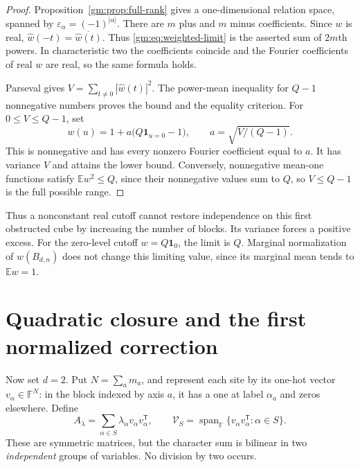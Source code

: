 \documentclass[11pt,a4paper]{article}
\numberwithin{equation}{section}
\theoremstyle{definition}
\theoremstyle{remark}
\newcommand{\F}{\mathbb F}
\newcommand{\E}{\mathbb E}
\newcommand{\1}{\mathbf 1}
\newcommand{\Span}{\operatorname{span}}
\begin{document}
\begin{proof}
Proposition~\ref{gm:prop:full-rank} gives a one-dimensional relation
space, spanned by $\varepsilon_\alpha=(-1)^{|\alpha|}$. There are $m$ plus
and $m$ minus coefficients. Since $w$ is real,
$\widehat w(-t)=\overline{\widehat w(t)}$. Thus
\eqref{gm:eq:weighted-limit} is the asserted sum of $2m$th powers. In
characteristic two the coefficients coincide and the Fourier coefficients
of real $w$ are real, so the same formula holds.

Parseval gives $V=\sum_{t\ne0}|\widehat w(t)|^2$. The power-mean
inequality for $Q-1$ nonnegative numbers proves the bound and the equality
criterion. For $0\leq V\leq Q-1$, set
\begin{equation}\label{gm:eq:cutoff-extremizer}
 w(u)=1+a\bigl(Q\1_{u=0}-1\bigr),\qquad
 a=\sqrt{V/(Q-1)}.
\end{equation}
This is nonnegative and has every nonzero Fourier coefficient equal to
$a$. It has variance $V$ and attains the lower bound. Conversely,
nonnegative mean-one functions satisfy $\E w^2\leq Q$, since their
nonnegative values sum to $Q$, so $V\leq Q-1$ is the full possible range.
\end{proof}

Thus a nonconstant real cutoff cannot restore independence on this first
obstructed cube by increasing the number of blocks. Its variance forces
a positive excess. For the zero-level cutoff $w=Q\1_0$, the limit is $Q$.
Marginal normalization of $w(B_{d,n})$ does not change this limiting value,
since its marginal mean tends to $\E w=1$.

\section{Quadratic closure and the first normalized correction}
\label{gm:sec:closure}

Now set $d=2$. Put $N=\sum_a m_a$, and represent each site by its one-hot
vector $v_\alpha\in\F^N$: in the block indexed by axis $a$, it has a one
at label $\alpha_a$ and zeros elsewhere. Define
\begin{equation}\label{gm:eq:matrix-space}
 A_\lambda=\sum_{\alpha\in S}\lambda_\alpha v_\alpha v_\alpha^{\mathsf T},
 \qquad
 \mathcal V_S=\Span_\F\{v_\alpha v_\alpha^{\mathsf T}:\alpha\in S\}.
\end{equation}
These are symmetric matrices, but the character sum is bilinear in two
\emph{independent} groups of variables. No division by two occurs.
\end{document}
